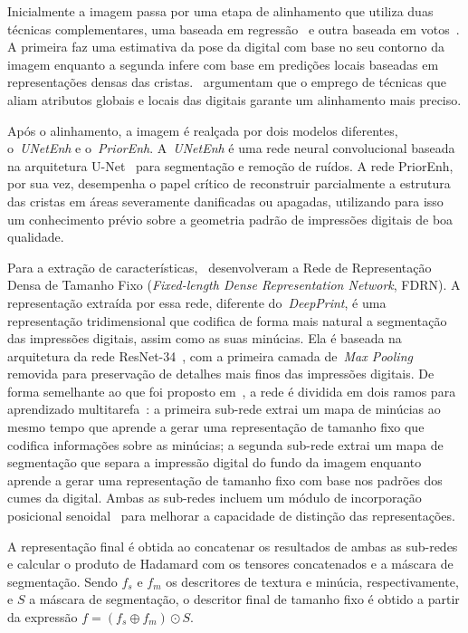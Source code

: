 Inicialmente a imagem passa por uma etapa de alinhamento que utiliza duas técnicas complementares, uma baseada em regressão~\cite{fingerprint_pose_via_regression} e outra baseada em votos~\cite{fingerprint_pose_via_dense_voting}. A primeira faz uma estimativa da pose da digital com base no seu contorno da imagem enquanto a segunda infere com base em predições locais baseadas em representações densas das cristas.~ argumentam que o emprego de técnicas que aliam atributos globais e locais das digitais garante um alinhamento mais preciso.

Após o alinhamento, a imagem é realçada por dois modelos diferentes, o~\textit{UNetEnh} e o~\textit{PriorEnh}. A~\textit{UNetEnh} é uma rede neural convolucional baseada na arquitetura U-Net~\cite{unet} para segmentação e remoção de ruídos. A rede PriorEnh, por sua vez, desempenha o papel crítico de reconstruir parcialmente a estrutura das cristas em áreas severamente danificadas ou apagadas, utilizando para isso um conhecimento prévio sobre a geometria padrão de impressões digitais de boa qualidade.

Para a extração de características,~ desenvolveram a Rede de Representação Densa de Tamanho Fixo (\textit{Fixed-length Dense Representation Network}, FDRN). A representação extraída por essa rede, diferente do~\textit{DeepPrint}, é uma representação tridimensional que codifica de forma mais natural a segmentação das impressões digitais, assim como as suas minúcias. Ela é baseada na arquitetura da rede ResNet-34~\cite{resnet-34}, com a primeira camada de~\textit{Max Pooling} removida para preservação de detalhes mais finos das impressões digitais. De forma semelhante ao que foi proposto em~\cite{deep_print}, a rede é dividida em dois ramos para aprendizado multitarefa~\cite{multitask-learning}: a primeira sub-rede extrai um mapa de minúcias ao mesmo tempo que aprende a gerar uma representação de tamanho fixo que codifica informações sobre as minúcias; a segunda sub-rede extrai um mapa de segmentação que separa a impressão digital do fundo da imagem enquanto aprende a gerar uma representação de tamanho fixo com base nos padrões dos cumes da digital. Ambas as sub-redes incluem um módulo de incorporação posicional senoidal~\cite{transformers} para melhorar a capacidade de distinção das representações.

A representação final é obtida ao concatenar os resultados de ambas as sub-redes e calcular o produto de Hadamard com os tensores concatenados e a máscara de segmentação. Sendo $f_s$ e $f_m$ os descritores de textura e minúcia, respectivamente, e $S$ a máscara de segmentação, o descritor final de tamanho fixo é obtido a partir da expressão $f = (f_s \oplus f_m) \odot S$. 

